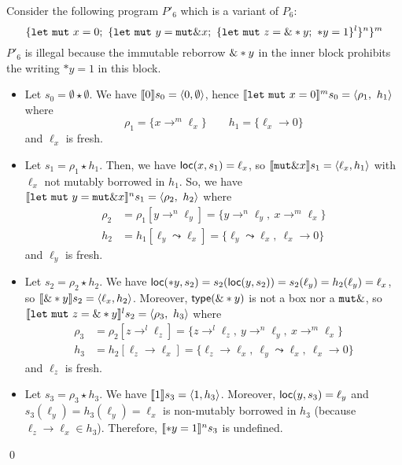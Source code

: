\begin{example}
  Consider the following program $P'_6$ which is a variant of $P_6$:
  \[
  \{
    \mathtt{let\ mut}\ x = 0;\
    \{
      \mathtt{let\ mut}\ y = \mathtt{mut}\borrow x;\
        \{
          \mathtt{let\ mut}\ z = \borrow*y;\
          *y = 1
        \}^l
      \}^n
    \}^m
  \]
  $P'_6$ is illegal because the immutable reborrow $\borrow *y$ in the inner
  block prohibits the writing $*y = 1$ in this block.
  \begin{itemize}
    \item Let $s_0=\emptyset \star \emptyset$.
    We have $\den[0]{s_0} = \langle 0,\emptyset\rangle$, hence
    $\denl[\mathtt{let\ mut}\ x = 0]{m}{s_0} =
    \langle \rho_1,\ h_1\rangle$ where
    \[\rho_1=\{x\to^m\ell_x\} \qquad
    h_1 = \{\ell_x\to 0\}\]
    and $\ell_x$ is fresh.
    \item Let $s_1 = \rho_1 \star h_1$.
    Then, we have $\loc(x,s_1) = \ell_x$, so
    $\den[\mathtt{mut}\borrow x]{s_1} = \langle\ell_x, h_1\rangle$
    with $\ell_x$ not mutably borrowed in $h_1$.
    So, we have
    $\denl[\mathtt{let\ mut}\ y = \mathtt{mut}\borrow x]{n}{s_1} =
    \langle \rho_2,\ h_2\rangle$
    where
    \begin{align*}
      \rho_2 & = \rho_1[y\to^n\ell_y] = \{y\to^n\ell_y,\ x\to^m\ell_x\}\\
      h_2 & = h_1[\ell_y\leadsto \ell_x] =
      \{\ell_y\leadsto \ell_x,\ \ell_x\to 0\}
    \end{align*}
    and $\ell_y$ is fresh.
    \item Let $s_2 = \rho_2 \star h_2$.
    We have $\loc(*y,s_2) = s_2(\loc(y,s_2)) = s_2(\ell_y) = h_2(\ell_y) = \ell_x$,
    so $\den[\borrow*y]{s_2} = \langle \ell_x,h_2\rangle$.
    Moreover, $\type(\borrow*y)$ is not a box nor a $\mathtt{mut}\borrow$, so
    $\denl[\mathtt{let\ mut}\ z = \borrow*y]{l}{s_2} =
    \langle \rho_3,\ h_3\rangle$
    where
    \begin{align*}
      \rho_3 & = \rho_2[z\to^l\ell_z] = \{z\to^l\ell_z,\ y\to^n\ell_y,\ x\to^m\ell_x\}\\
      h_3 & = h_2[\ell_z\to \ell_x] =
      \{\ell_z\to \ell_x,\ \ell_y\leadsto \ell_x,\ \ell_x\to 0\}
    \end{align*}
    and $\ell_z$ is fresh.
    \item Let $s_3 = \rho_3 \star h_3$.
    We have $\den[1]{s_3} = \langle 1,h_3\rangle$. Moreover,
    $\loc(y,s_3) = \ell_y$ and $s_3(\ell_y) = h_3(\ell_y) = \ell_x$
    is non-mutably borrowed in $h_3$ (because $\ell_z\to \ell_x \in h_3$).
    Therefore, $\denl[*y = 1]{n}{s_3}$ is undefined.
  \end{itemize}
  \qed
\end{example}
